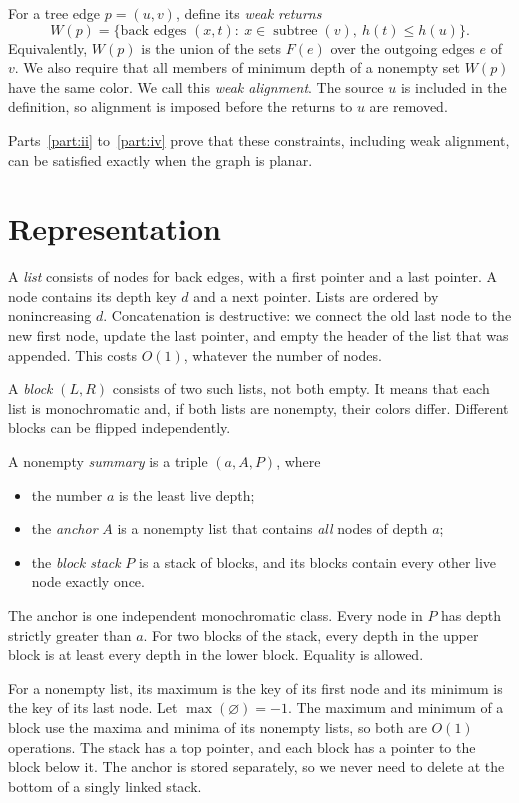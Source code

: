 \documentclass[11pt]{article}
\DeclareMathOperator{\subtree}{subtree}
\DeclareMathOperator{\maxkey}{max}
\begin{document}
For a tree edge $p=(u,v)$, define its \emph{weak returns}
\begin{equation*}
W(p)=\{\text{back edges }(x,t):\ x\in\subtree(v),\ h(t)\le h(u)\}.
\end{equation*}
Equivalently, $W(p)$ is the union of the sets $F(e)$ over the outgoing edges
$e$ of $v$. We also require that all members of minimum depth of a nonempty
set $W(p)$ have the same color. We call this \emph{weak alignment}. The source
$u$ is included in the definition, so alignment is imposed before the returns
to $u$ are removed.

Parts~\ref{part:ii} to~\ref{part:iv} prove that these constraints, including
weak alignment, can be satisfied exactly when the graph is planar.

\section{Representation}

A \emph{list} consists of nodes for back edges, with a first pointer and a last
pointer. A node contains its depth key $d$ and a next pointer. Lists are ordered
by nonincreasing $d$. Concatenation is destructive: we connect the old last
node to the new first node, update the last pointer, and empty the header of
the list that was appended. This costs $O(1)$, whatever the number of nodes.

A \emph{block} $(L,R)$ consists of two such lists, not both empty. It means
that each list is monochromatic and, if both lists are nonempty, their colors
differ. Different blocks can be flipped independently.

A nonempty \emph{summary} is a triple $(a,A,P)$, where
\begin{itemize}[nosep]
\item the number $a$ is the least live depth;
\item the \emph{anchor} $A$ is a nonempty list that contains \emph{all} nodes of
depth $a$;
\item the \emph{block stack} $P$ is a stack of blocks, and its blocks contain
every other live node exactly once.
\end{itemize}
The anchor is one independent monochromatic class. Every node in $P$ has depth
strictly greater than $a$. For two blocks of the stack, every depth in the
upper block is at least every depth in the lower block. Equality is allowed.

For a nonempty list, its maximum is the key of its first node and its minimum
is the key of its last node. Let $\maxkey(\varnothing)=-1$. The maximum and
minimum of a block use the maxima and minima of its nonempty lists, so both
are $O(1)$ operations. The stack has a top pointer, and each block has a
pointer to the block below it. The anchor is stored separately, so we never
need to delete at the bottom of a singly linked stack.
\end{document}
